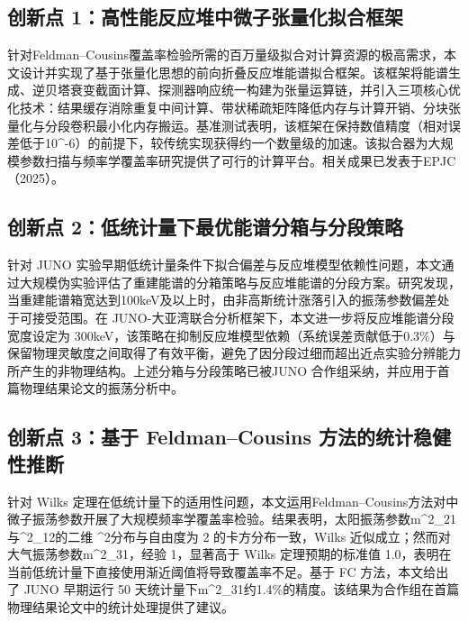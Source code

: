 \subsection*{创新点 1：高性能反应堆中微子张量化拟合框架}

针对Feldman--Cousins覆盖率检验所需的百万量级拟合对计算资源的极高需求，本文设计并实现了基于张量化思想的前向折叠反应堆能谱拟合框架。该框架将能谱生成、逆贝塔衰变截面计算、探测器响应统一构建为张量运算链，并引入三项核心优化技术：结果缓存消除重复中间计算、带状稀疏矩阵降低内存与计算开销、分块张量化与分段卷积最小化内存搬运。基准测试表明，该框架在保持数值精度（相对误差低于10^{-6}）的前提下，较传统实现获得约一个数量级的加速。该拟合器为大规模参数扫描与频率学覆盖率研究提供了可行的计算平台。相关成果已发表于EPJC（2025）。

\subsection*{创新点 2：低统计量下最优能谱分箱与分段策略}

针对 JUNO 实验早期低统计量条件下拟合偏差与反应堆模型依赖性问题，本文通过大规模伪实验评估了重建能谱的分箱策略与反应堆能谱的分段方案。研究发现，当重建能谱箱宽达到100keV及以上时，由非高斯统计涨落引入的振荡参数偏差处于可接受范围。在 JUNO-大亚湾联合分析框架下，本文进一步将反应堆能谱分段宽度设定为 300keV，该策略在抑制反应堆模型依赖（系统误差贡献低于0.3\%）与保留物理灵敏度之间取得了有效平衡，避免了因分段过细而超出近点实验分辨能力所产生的非物理结构。上述分箱与分段策略已被JUNO 合作组采纳，并应用于首篇物理结果论文的振荡分析中。

\subsection*{创新点 3：基于 Feldman--Cousins 方法的统计稳健性推断}

针对 Wilks 定理在低统计量下的适用性问题，本文运用Feldman--Cousins方法对中微子振荡参数开展了大规模频率学覆盖率检验。结果表明，太阳振荡参数\Delta m^2_{21}与\sin^2\theta_{12}的二维 \Delta\chi^2分布与自由度为 2 的卡方分布一致，Wilks 近似成立；然而对大气振荡参数\Delta m^2_{31}，经验 1，显著高于 Wilks 定理预期的标准值 1.0，表明在当前低统计量下直接使用渐近阈值将导致覆盖率不足。基于 FC 方法，本文给出了 JUNO 早期运行 50 天统计量下\Delta m^2_{31}约1.4\%的精度。该结果为合作组在首篇物理结果论文中的统计处理提供了建议。
